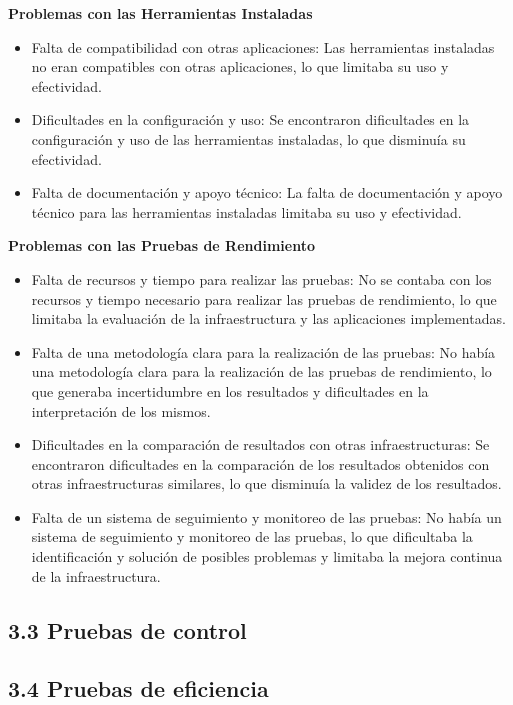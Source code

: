 \begin{doublespace}
\begin{multicols}{2}
    \textbf{Problemas con las Herramientas Instaladas}

    \begin{itemize}
        \item Falta de compatibilidad con otras aplicaciones: Las herramientas instaladas no eran compatibles con otras aplicaciones, lo que limitaba su uso y efectividad.
        \item Dificultades en la configuración y uso: Se encontraron dificultades en la configuración y uso de las herramientas instaladas, lo que disminuía su efectividad.
        \item Falta de documentación y apoyo técnico: La falta de documentación y apoyo técnico para las herramientas instaladas limitaba su uso y efectividad.
    \end{itemize}

    \textbf{Problemas con las Pruebas de Rendimiento}

    \begin{itemize}
        \item Falta de recursos y tiempo para realizar las pruebas: No se contaba con los recursos y tiempo necesario para realizar las pruebas de rendimiento, lo que limitaba la evaluación de la infraestructura y las aplicaciones implementadas.
        \item Falta de una metodología clara para la realización de las pruebas: No había una metodología clara para la realización de las pruebas de rendimiento, lo que generaba incertidumbre en los resultados y dificultades en la interpretación de los mismos.
        \item Dificultades en la comparación de resultados con otras infraestructuras: Se encontraron dificultades en la comparación de los resultados obtenidos con otras infraestructuras similares, lo que disminuía la validez de los resultados.
        \item Falta de un sistema de seguimiento y monitoreo de las pruebas: No había un sistema de seguimiento y monitoreo de las pruebas, lo que dificultaba la identificación y solución de posibles problemas y limitaba la mejora continua de la infraestructura.
    \end{itemize}

    \subsection{3.3 Pruebas de control}

    \subsection{3.4 Pruebas de eficiencia}


\end{multicols}
\end{doublespace}
